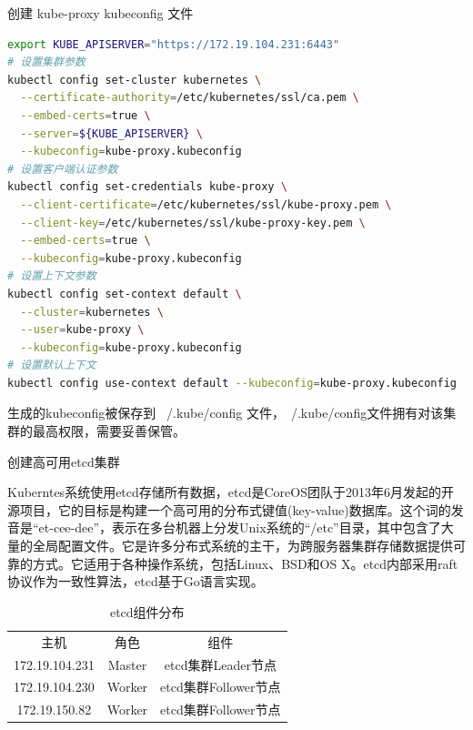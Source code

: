 \documentclass[8pt]{book}
\makeatletter
\numberwithin{dummy}{section}
\theoremstyle{ocrenumbox}
\theoremstyle{blacknumex}
\theoremstyle{blacknumbox}
\theoremstyle{ocrenum}
\renewcommand{\subsubsection}{\@startsection {subsubsection}{3}{\z@}
	{-2ex \@plus -0.1ex \@minus -.2ex}
	{.2ex \@plus.2ex }
	{\normalfont\small\sffamily\bfseries}}
\renewcommand\paragraph{\@startsection{paragraph}{4}{\z@}
	{-2ex \@plus-.2ex \@minus .2ex}
	{.1ex}
	{\normalfont\small\sffamily\bfseries}}
\makeatother
\begin{document}
\paragraph{创建 kube-proxy kubeconfig 文件}

\begin{lstlisting}[language=Bash]
export KUBE_APISERVER="https://172.19.104.231:6443"
# 设置集群参数
kubectl config set-cluster kubernetes \
  --certificate-authority=/etc/kubernetes/ssl/ca.pem \
  --embed-certs=true \
  --server=${KUBE_APISERVER} \
  --kubeconfig=kube-proxy.kubeconfig
# 设置客户端认证参数
kubectl config set-credentials kube-proxy \
  --client-certificate=/etc/kubernetes/ssl/kube-proxy.pem \
  --client-key=/etc/kubernetes/ssl/kube-proxy-key.pem \
  --embed-certs=true \
  --kubeconfig=kube-proxy.kubeconfig
# 设置上下文参数
kubectl config set-context default \
  --cluster=kubernetes \
  --user=kube-proxy \
  --kubeconfig=kube-proxy.kubeconfig
# 设置默认上下文
kubectl config use-context default --kubeconfig=kube-proxy.kubeconfig
\end{lstlisting}

生成的kubeconfig被保存到 ~/.kube/config 文件，~/.kube/config文件拥有对该集群的最高权限，需要妥善保管。

\subsubsection{创建高可用etcd集群}

Kuberntes系统使用etcd存储所有数据，etcd是CoreOS团队于2013年6月发起的开源项目，它的目标是构建一个高可用的分布式键值(key-value)数据库。这个词的发音是“et-cee-dee”，表示在多台机器上分发Unix系统的“/etc”目录，其中包含了大量的全局配置文件。它是许多分布式系统的主干，为跨服务器集群存储数据提供可靠的方式。它适用于各种操作系统，包括Linux、BSD和OS X。etcd内部采用raft协议作为一致性算法，etcd基于Go语言实现。


\begin{table}[htbp]
	\caption{etcd组件分布}
	\label{table:etcd-cluster}
	\begin{center}
		\begin{tabular}{|c|c|c|}
			\hline
			\multirow{1}{*}{主机}
			& \multicolumn{1}{c|}{角色}
			& \multicolumn{1}{c|}{组件}\\			
			\cline{1-3}
			172.19.104.231 & Master &  etcd集群Leader节点\\
			\hline
			172.19.104.230 & Worker &  etcd集群Follower节点\\
			\hline
			172.19.150.82 & Worker &  etcd集群Follower节点\\
			\hline						
		\end{tabular}	
	\end{center}
\end{table}
\end{document}
